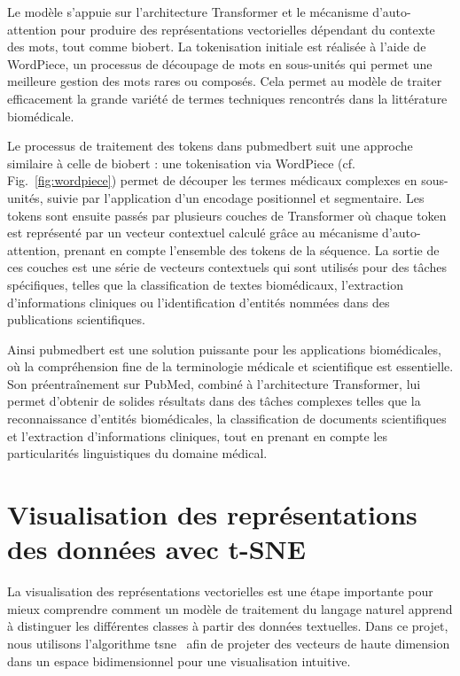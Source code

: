 \documentclass[12pt]{report}
\begin{document}
Le modèle s'appuie sur l’architecture Transformer et le mécanisme d’auto-attention pour produire des représentations vectorielles dépendant du contexte des mots, tout comme \gls{biobert}. La tokenisation initiale est réalisée à l’aide de WordPiece, un processus de découpage de mots en sous-unités qui permet une meilleure gestion des mots rares ou composés. Cela permet au modèle de traiter efficacement la grande variété de termes techniques rencontrés dans la littérature biomédicale.

Le processus de traitement des tokens dans \gls{pubmedbert} suit une approche similaire à celle de \gls{biobert} : une tokenisation via WordPiece (cf. Fig.~\ref{fig:wordpiece}) permet de découper les termes médicaux complexes en sous-unités, suivie par l'application d'un encodage positionnel et segmentaire. Les tokens sont ensuite passés par plusieurs couches de Transformer où chaque token est représenté par un vecteur contextuel calculé grâce au mécanisme d’auto-attention, prenant en compte l'ensemble des tokens de la séquence. La sortie de ces couches est une série de vecteurs contextuels qui sont utilisés pour des tâches spécifiques, telles que la classification de textes biomédicaux, l'extraction d'informations cliniques ou l'identification d'entités nommées dans des publications scientifiques.

Ainsi \gls{pubmedbert} est une solution puissante pour les applications biomédicales, où la compréhension fine de la terminologie médicale et scientifique est essentielle. Son préentraînement sur PubMed, combiné à l’architecture Transformer, lui permet d’obtenir de solides résultats dans des tâches complexes telles que la reconnaissance d'entités biomédicales, la classification de documents scientifiques et l’extraction d’informations cliniques, tout en prenant en compte les particularités linguistiques du domaine médical.

\section{Visualisation des représentations des données avec t-SNE}
\label{sec:tsne}

La visualisation des représentations vectorielles est une étape importante pour mieux comprendre comment un modèle de traitement du langage naturel apprend à distinguer les différentes classes à partir des données textuelles. Dans ce projet, nous utilisons l’algorithme \gls{tsne}~\cite{van2008visualizing} afin de projeter des vecteurs de haute dimension dans un espace bidimensionnel pour une visualisation intuitive.
\end{document}

